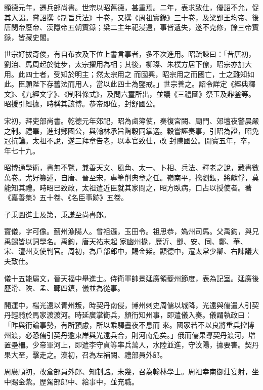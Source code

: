 \begin{pinyinscope}
 顯德元年，遷兵部尚書。世宗以昭舊德，甚重焉。二年，表求致仕，優詔不允，促其入謁。嘗詔撰《制旨兵法》十卷，又撰《周祖實錄》三十卷，及梁郢王均帝、後唐閔帝廢帝、漢隱帝五朝實錄；梁二主年祀浸遠，事皆遺失，遂不克修，餘三帝實錄，皆藏史閣。



 世宗好拔奇俊，有自布衣及下位上書言事者，多不次進用。昭疏諫曰：「昔唐初，劉洎、馬周起於徒步，太宗擢用為相；其後，柳璨、朱樸方居下僚，昭宗亦加大用。此四士者，受知於明主；然太宗用之
 而國興，昭宗用之而國亡，士之難知如此。臣願陛下存舊法而用人，當以此四士為鑒戒。」世宗善之。詔令詳定《經典釋文》、《九經文字》、《制科條式》，及問六璽所出，並議《三禮圖》祭玉及鼎釜等。昭援引經據，時稱其該博。恭帝即位，封舒國公。



 宋初，拜吏部尚書。乾德元年郊祀，昭為鹵簿使，奏復宮闕、廟門、郊壇夜警晨嚴之制。禮畢，進封鄭國公，與翰林承旨陶穀同掌選。穀嘗誣奏事，引昭為證，昭免冠抗論。太祖不說，遂三拜章告老，以本官致仕，改
 封陳國公。開寶五年，卒，年七十九。



 昭博通學術，書無不覽，兼善天文、風角、太一、卜相、兵法、釋老之說，藏書數萬卷。尤好纂述，自唐、晉至宋，專筆削典章之任。嶺南平，擒劉鋹，將獻俘，莫能知其禮。時昭已致政，太祖遣近臣就其家問之，昭方臥病，口占以授使者。著《嘉善集》五十卷、《名臣事跡》五卷。



 子秉圖進士及第，秉謙至尚書郎。



 竇儀，字可像。薊州漁陽人。曾祖遜，玉田令。祖思恭，媯州司馬。父禹鈞，與兄禹錫皆以詞學名。禹鈞，唐天祐末起
 家幽州掾，歷沂、鄧、安、同、鄭、華、宋、澶州支使判官。周初，為戶部郎中，賜金紫。顯德中，遷太常少卿、右諫議大夫致仕。



 儀十五能屬文，晉天福中舉進士。侍衛軍帥景延廣領夔州節度，表為記室。延廣後歷滑、陜、孟、鄆四鎮，儀並為從事。



 開運中，楊光遠以青州叛，時契丹南侵，博州刺史周儒以城降，光遠與儒遣人引契丹輕騎於馬家渡渡河。時延廣掌衛兵，顏衎知州事，即遣儀入奏。儀謂執政曰：「昨與衎論事勢，有所預慮，所以乘驛晝夜不息而
 來。國家若不以良將重兵控博州渡，必恐儒引契丹逾東岸與光遠兵合，則河南危矣。」俄而儒果導契丹渡河，增置壘柵。少帝軍河上，即遣李守貞等率兵萬人，水陸並進，守汶陽，據要害。契丹果大至，擊走之。漢初，召為左補闕、禮部員外郎。



 周廣順初，改倉部員外郎、知制誥。未幾，召為翰林學士。周祖幸南御莊宴射，坐中賜金紫。歷駕部郎中、給事中，並充職。




\end{pinyinscope}
